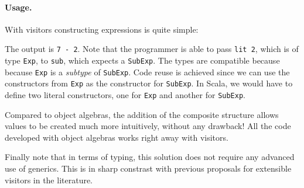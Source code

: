 
\paragraph{Usage.} With visitors constructing expressions is quite simple:

\begin{comment}
  \begin{lstlisting}{language=F2J}
    e2 = sub (lit 7) (lit 2)
  \end{lstlisting}
\end{comment}
The output is \lstinline$7 - 2$. Note that the programmer is able to pass \lstinline{lit 2}, which is of type \lstinline{Exp},
to \lstinline{sub}, which expects a \lstinline{SubExp}. The types are compatible
because because \lstinline$Exp$ is a \emph{subtype} of \lstinline$SubExp$. Code
reuse is achieved since we can use the constructors from \lstinline$Exp$ as the
constructor for \lstinline$SubExp$. In Scala, we would have to define two
literal constructors, one for \lstinline$Exp$ and another for
\lstinline$SubExp$. 

Compared to object algebras, the addition of the composite structure
allows values to be created much more intuitively, without any
drawback! All the code developed with object algebras works right
away with visitors. 

Finally note that in terms of typing, this solution does not require
any advanced use of generics. This is in sharp constrast with previous 
proposals for extensible visitors in the literature.




